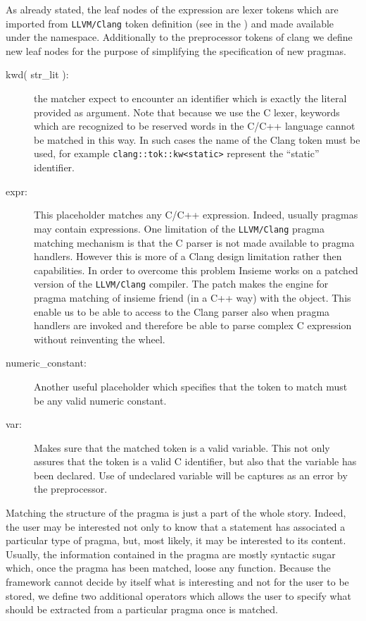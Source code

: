 As already stated, the leaf nodes of the expression are lexer tokens which are
imported from {\tt LLVM/Clang} token definition (see in the
) and made available under the
 namespace. Additionally to the preprocessor tokens
of clang we define new leaf nodes for the purpose of simplifying the
specification of new pragmas. 

\begin{description}
\item [kwd( str\_lit ):] the matcher expect to encounter an identifier which is
exactly the literal provided as argument. Note that because we use the C lexer,
keywords which are recognized to be reserved words in the C/C++ language cannot
be matched in this way. In such cases the name of the Clang token must be used,
for example {\tt clang::tok::kw<static>} represent the ``static'' identifier. 

\item [expr:] This placeholder matches any C/C++ expression. Indeed, usually
pragmas may contain expressions. One limitation of the {\tt LLVM/Clang} pragma
matching mechanism is that the C parser is not made available to pragma
handlers. However this is more of a Clang design limitation rather then
capabilities. In order to overcome this problem Insieme works on a patched
version of the {\tt LLVM/Clang} compiler.  The patch makes the engine for pragma
matching of insieme friend (in a C++ way) with the  object.
This enable us to be able to access to the Clang parser also when pragma
handlers are invoked and therefore be able to parse complex C expression without
reinventing the wheel. 

\item [numeric\_constant:] Another useful placeholder which specifies that the
token to match must be any valid numeric constant. 

\item [var:] Makes sure that the matched token is a valid variable. This not
only assures that the token is a valid C identifier, but also that the variable
has been declared. Use of undeclared variable will be captures as an error by
the preprocessor. 

\end{description}


Matching the structure of the pragma is just a part of the whole story. Indeed,
the user may be interested not only to know that a statement has associated a
particular type of pragma, but, most likely, it may be interested to its content. 
Usually, the information contained in the pragma
are mostly syntactic sugar which, once the pragma has been matched, loose any
function. Because the framework cannot decide by itself what is
interesting and not for the user to be stored, we define two additional
operators which allows the user to specify what should be extracted from a
particular pragma once is matched. 


